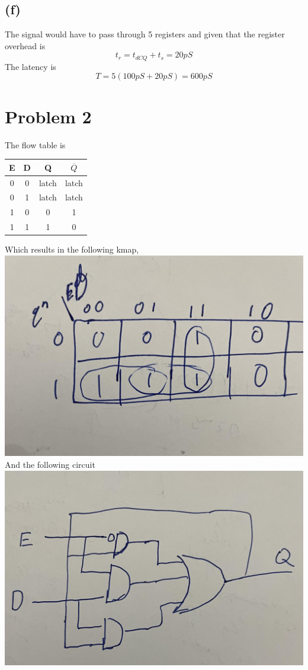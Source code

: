\documentclass[12pt]{article}
\begin{document}
\subsection*{(f)}
The signal would have to pass through 5 registers and given that the register overhead is 
$$t_{r}=t_{dCQ}+t_s=20pS$$
The latency is 
$$T=5(100pS+20pS)=\boxed{600pS}$$
\section*{Problem 2}
The flow table is 
\begin{center}
    \begin{tabular}{|c|c|c|c|}
        E & D & Q & $\overline{Q}$\\
        \hline
        0 & 0 & latch & latch\\
        \hline
        0 & 1 & latch & latch\\
        \hline
        1 & 0 & 0 & 1\\
        \hline
        1 & 1 & 1 & 0\\
        \hline
    \end{tabular}
\end{center}
Which results in the following kmap, \\
\includegraphics[scale=0.2]{Fig3.jpg}\\
And the following circuit\\
\includegraphics[scale=0.25]{Fig4.jpg}\\
\end{document}
